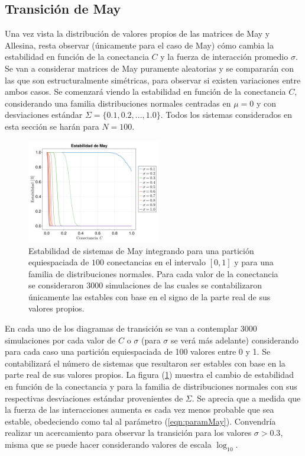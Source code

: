 \subsection{Transición de May}

Una vez vista la distribución de valores propios de las matrices de May y Allesina, resta observar (únicamente para el caso de May) cómo cambia la estabilidad en función de la conectancia $C$ y la fuerza de interacción promedio $\sigma$. Se van a considerar matrices de May puramente aleatorias y se compararán con las que son estructuralmente simétricas, para observar si existen variaciones entre ambos casos. Se comenzará viendo la estabilidad en función de la conectancia $C$, considerando una familia distribuciones normales centradas en $\mu=0$ y con desviaciones estándar $\Sigma = \{0.1,0.2,...,1.0\}$. Todos los sistemas considerados en esta sección se harán para $N=100$. 
\begin{figure} \vspace{-30pt} \begin{center}
		\includegraphics[width=0.52\textwidth]{../Imagenes/TransicionMayDirLin} 
	\end{center} 
	\vspace{-20pt} 
	\caption{Estabilidad de sistemas de May integrando para una partición equiespaciada de  $100$ conectancias en el intervalo $[0,1]$ y para una familia de distribuciones normales. Para cada valor de la conectancia se consideraron $3000$ simulaciones de las cuales se contabilizaron únicamente las estables con base en el signo de la parte real de sus valores propios.} 
	\vspace{-10pt}
	\label{fig:TransicionMayDirLin}
\end{figure} 
En cada uno de los diagramas de transición se van a contemplar $3000$ simulaciones por cada valor de $C$ o $\sigma$ (para $\sigma$ se verá más adelante) considerando para cada caso una partición equiespaciada de 100 valores entre 0 y 1. Se contabilizará el número de sistemas que resultaron ser estables con base en la parte real de sus valores propios. La figura (\ref{fig:TransicionMayDirLin}) muestra el cambio de estabilidad en función de la conectancia y para la familia de distribuciones normales con sus respectivas desviaciones estándar provenientes de $\Sigma$. Se aprecia que a medida que la fuerza de las interacciones aumenta es cada vez menos probable que sea estable, obedeciendo como tal al parámetro (\ref{eqn:paramMay}). Convendría realizar un acercamiento para observar la transición para los valores $\sigma>0.3$, misma que se puede hacer considerando valores de escala $\log_{10}$.\\
